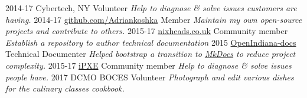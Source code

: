 \documentclass[]{friggeri-cv}
\begin{document}
\begin{entrylist}
  \entry
    {2014-17}
    {Cybertech, NY}
    {Volunteer}
    {\emph{Help to diagnose \& solve issues customers are having.}}
  \entry
    {2014-17}
    {\href{https://github.com/AdrianKoshka/}{github.com/Adriankoshka}}
    {Member}
    {\emph{Maintain my own open-source projects and contribute to others.}}
  \entry
    {2015-17}
    {\href{http://nixheads.co.uk}{nixheads.co.uk}}
    {Community member}
    {\emph{Establish a repository to author technical documentation}}
  \entry
    {2015}
    {\href{https://github.com/OpenIndiana/oi-docs}{OpenIndiana-docs}}
    {Technical Documenter}
    {\emph{Helped bootstrap a transition to \href{http://www.mkdocs.org/}{MkDocs} to reduce project complexity.}}
  \entry
    {2015-17}
    {\href{http://ipxe.org}{iPXE}}
    {Community member}
    {\emph{Help to diagnose \& solve issues people have.}}
  \entry
    {2017}
    {DCMO BOCES}
    {Volunteer}
    {\emph{Photograph and edit various dishes for the culinary classes cookbook.}}
\end{entrylist}

%
%
%

% 
\end{document}
